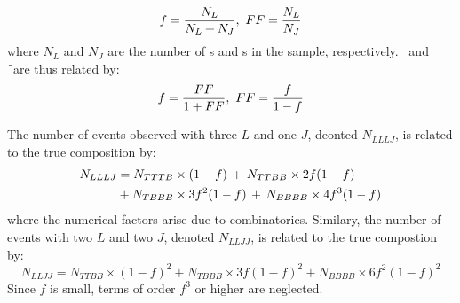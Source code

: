 \begin{equation}
f = \frac{N_{L}}{N_{L} + N_{J}},\ FF = \frac{N_{L}}{N_{J}}
\end{equation}
where $N_{L}$ and $N_{J}$ are the number of \sellep s and \lljet s in the sample,
respectively. \FF\ and \f\ are thus related by:
\begin{equation}
f = \frac{FF}{1 + FF},\ FF = \frac{f}{1-f}
\label{eqn:bg-f-FF-relations}
\end{equation}


The number of events observed with three $L$ and one $J$, deonted $N_{LLLJ}$, is related to
the true composition by:
\begin{align}
N_{LLLJ} &= N_{TTTB} \times (1-f)\, +\, N_{TTBB} \times 2f(1-f) \notag \\
         &+ N_{TBBB} \times 3f^{2}(1-f)\, +\,  N_{BBBB} \times 4f^{3}(1-f) 
\end{align}
where the numerical factors arise due to combinatorics. Similary, the number of
events with two $L$ and two $J$, denoted $N_{LLJJ}$, is related to the
true compostion by:
\begin{equation}
N_{LLJJ} = N_{TTBB} \times (1-f)^{2} + N_{TBBB} \times 3 f(1-f)^{2}  + N_{BBBB}
\times 6 f^{2}(1-f)^{2}
\end{equation}
Since $f$ is small,
terms of order $f^{3}$ or higher are neglected.

